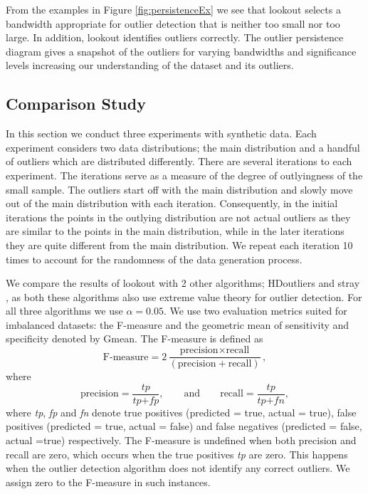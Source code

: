 \documentclass[11pt,a4paper,]{article}
\theoremstyle{definition}
\theoremstyle{definition}
\theoremstyle{definition}
\theoremstyle{remark}
\begin{document}
From the examples in Figure \ref{fig:persistenceEx} we see that lookout selects a bandwidth appropriate for outlier detection that is neither too small nor too large. In addition, lookout identifies outliers correctly. The outlier persistence diagram gives a snapshot of the outliers for varying bandwidths and significance levels increasing our understanding of the dataset and its outliers.

\hypertarget{sec:SyntheticComparison}{%
\subsection{Comparison Study}\label{sec:SyntheticComparison}}

In this section we conduct three experiments with synthetic data. Each experiment considers two data distributions; the main distribution and a handful of outliers which are distributed differently. There are several iterations to each experiment. The iterations serve as a measure of the degree of outlyingness of the small sample. The outliers start off with the main distribution and slowly move out of the main distribution with each iteration. Consequently, in the initial iterations the points in the outlying distribution are not actual outliers as they are similar to the points in the main distribution, while in the later iterations they are quite different from the main distribution. We repeat each iteration 10 times to account for the randomness of the data generation process.

We compare the results of lookout with 2 other algorithms; HDoutliers \autocite{wilkinson2017visualizing} and stray \autocite{stray}, as both these algorithms also use extreme value theory for outlier detection. For all three algorithms we use \(\alpha = 0.05\). We use two evaluation metrics suited for imbalanced datasets: the F-measure and the geometric mean of sensitivity and specificity denoted by Gmean. The F-measure is defined as
\begin{equation}\label{eq:fmeasure}
    \text{F-measure} = 2\frac{\text{precision} \times \text{recall}}{\left( \text{precision} + \text{recall} \right) }  ,
\end{equation}
where
\begin{equation}\label{eq:pr}
    \text{precision} = \frac{ \textit{tp} }{\textit{tp} + \textit{fp}}  , \qquad \text{and} \qquad \text{recall} = \frac{\textit{tp}}{\textit{tp} + \textit{fn}}  ,
\end{equation}
where \emph{tp}, \emph{fp} and \emph{fn} denote true positives (predicted = true, actual = true), false positives (predicted = true, actual = false) and false negatives (predicted = false, actual =true) respectively. The F-measure is undefined when both precision and recall are zero, which occurs when the true positives \emph{tp} are zero. This happens when the outlier detection algorithm does not identify any correct outliers. We assign zero to the F-measure in such instances.
\end{document}
